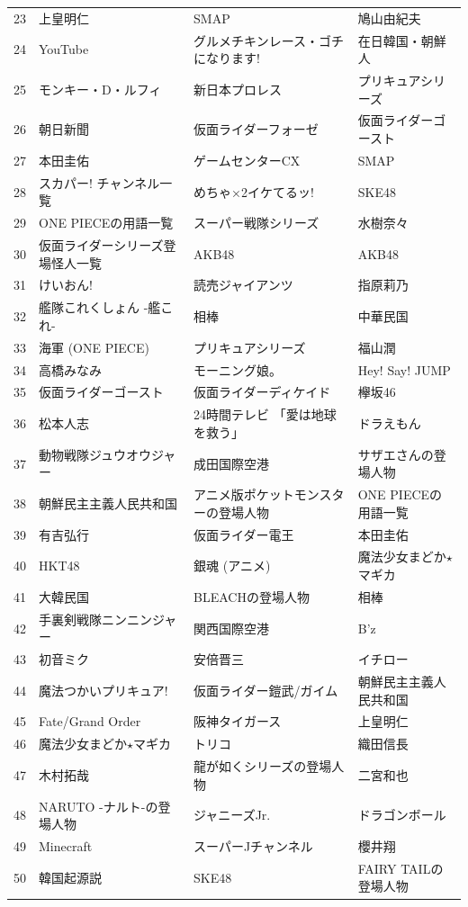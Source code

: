 \documentclass[10pt,british,A4paper,twoside]{memoir}
\begin{document}
\begin{table}
{\begin{tabular}{@{}p{0.1cm}lll@{}}
23&上皇明仁&SMAP&鳩山由紀夫\\
24&YouTube&グルメチキンレース・ゴチになります!&在日韓国・朝鮮人\\
25&モンキー・D・ルフィ&新日本プロレス&プリキュアシリーズ\\
26&朝日新聞&仮面ライダーフォーゼ&仮面ライダーゴースト\\
27&本田圭佑&ゲームセンターCX&SMAP\\
28&スカパー! チャンネル一覧&めちゃ×2イケてるッ!&SKE48\\
29&ONE PIECEの用語一覧&スーパー戦隊シリーズ&水樹奈々\\
30&仮面ライダーシリーズ登場怪人一覧&AKB48&AKB48\\
31&けいおん!&読売ジャイアンツ&指原莉乃\\
32&艦隊これくしょん -艦これ-&相棒&中華民国\\
33&海軍 (ONE PIECE)&プリキュアシリーズ&福山潤\\
34&高橋みなみ&モーニング娘。&Hey! Say! JUMP\\
35&仮面ライダーゴースト&仮面ライダーディケイド&欅坂46\\
36&松本人志&24時間テレビ 「愛は地球を救う」&ドラえもん\\
37&動物戦隊ジュウオウジャー&成田国際空港&サザエさんの登場人物\\
38&朝鮮民主主義人民共和国&アニメ版ポケットモンスターの登場人物&ONE PIECEの用語一覧\\
39&有吉弘行&仮面ライダー電王&本田圭佑\\
40&HKT48&銀魂 (アニメ)&魔法少女まどか$\star$マギカ\\
41&大韓民国&BLEACHの登場人物&相棒\\
42&手裏剣戦隊ニンニンジャー&関西国際空港&B'z\\
43&初音ミク&安倍晋三&イチロー\\
44&魔法つかいプリキュア!&仮面ライダー鎧武/ガイム&朝鮮民主主義人民共和国\\
45&Fate/Grand Order&阪神タイガース&上皇明仁\\
46&魔法少女まどか$\star$マギカ&トリコ&織田信長\\
47&木村拓哉&龍が如くシリーズの登場人物&二宮和也\\
48&NARUTO -ナルト-の登場人物&ジャニーズJr.&ドラゴンボール\\
49&Minecraft&スーパーJチャンネル&櫻井翔\\
50&韓国起源説&SKE48&FAIRY TAILの登場人物\\
\bottomrule
\end{tabular}
}
\end{table}
\end{document}
